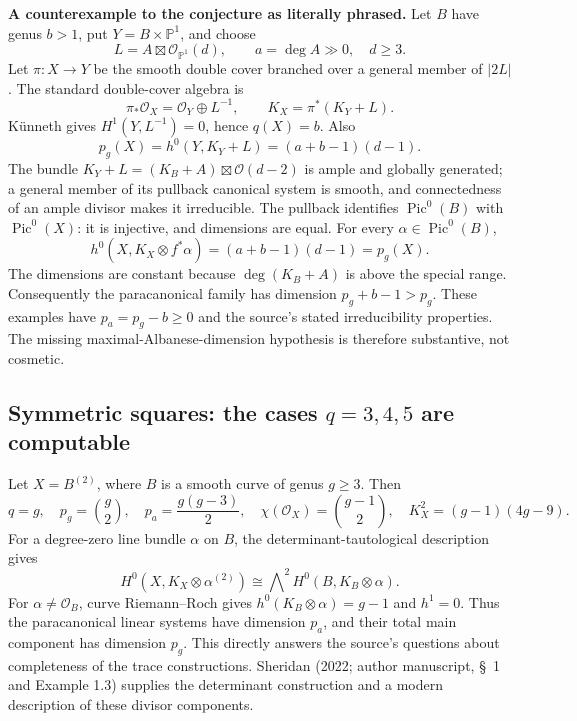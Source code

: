 \textbf{A counterexample to the conjecture as literally phrased.} Let \(B\) have genus \(b>1\), put \(Y=B\times\mathbb P^1\), and choose
\[
L=A\boxtimes\mathcal O_{\mathbb P^1}(d),\qquad
a=\deg A\gg0,\quad d\geq3.
\]
Let \(\pi:X\to Y\) be the smooth double cover branched over a general member of \(\vert 2L\vert \). The standard double-cover algebra is
\[
\pi_*\mathcal O_X=\mathcal O_Y\oplus L^{-1},\qquad
K_X=\pi^*(K_Y+L).
\]
Künneth gives \(H^1(Y,L^{-1})=0\), hence \(q(X)=b\). Also
\[
p_g(X)=h^0(Y,K_Y+L)=(a+b-1)(d-1).
\]
The bundle \(K_Y+L=(K_B+A)\boxtimes\mathcal O(d-2)\) is ample and globally generated; a general member of its pullback canonical system is smooth, and connectedness of an ample divisor makes it irreducible. The pullback identifies \(\operatorname{Pic}^0(B)\) with \(\operatorname{Pic}^0(X)\): it is injective, and dimensions are equal. For every \(\alpha\in\operatorname{Pic}^0(B)\),
\[
h^0(X,K_X\otimes f^*\alpha)=(a+b-1)(d-1)=p_g(X).
\]
The dimensions are constant because \(\deg(K_B+A)\) is above the special range. Consequently the paracanonical family has dimension \(p_g+b-1>p_g\). These examples have \(p_a=p_g-b\geq0\) and the source's stated irreducibility properties. The missing maximal-Albanese-dimension hypothesis is therefore substantive, not cosmetic.

\subsection{Symmetric squares: the cases \texorpdfstring{$q=3,4,5$}{q=3,4,5} are computable}\label{cp2-ix-8-3}

Let \(X=B^{(2)}\), where \(B\) is a smooth curve of genus \(g\geq3\). Then
\[
q=g,\quad p_g=\binom g2,\quad
p_a=\frac{g(g-3)}2,\quad
\chi(\mathcal O_X)=\binom{g-1}{2},\quad
K_X^2=(g-1)(4g-9).
\]
For a degree-zero line bundle \(\alpha\) on \(B\), the determinant-tautological description gives
\begin{equation*}\label{cp2-ix-eq7}
H^0(X,K_X\otimes\alpha^{(2)})
\cong\bigwedge\nolimits^2 H^0(B,K_B\otimes\alpha).
\tag{IX.7}
\end{equation*}
For \(\alpha\ne\mathcal O_B\), curve Riemann--Roch gives \(h^0(K_B\otimes\alpha)=g-1\) and \(h^1=0\). Thus the paracanonical linear systems have dimension \(p_a\), and their total main component has dimension \(p_g\). This directly answers the source's questions about completeness of the trace constructions. Sheridan (2022; author manuscript, \S~1 and Example 1.3) supplies the determinant construction and a modern description of these divisor components.


